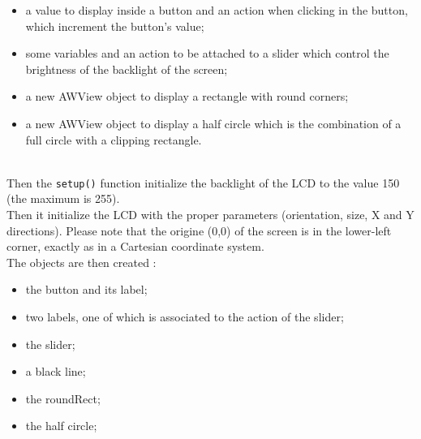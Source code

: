 \documentclass[a4paper,11pt]{extarticle}
\begin{document}
\begin{itemize}
\item  a value to display inside a button and an action when clicking in the button, which increment the button's value; 
 \item some variables and an action to be attached to a slider which control the brightness of the backlight of the screen;
 \item a new AWView object to display a rectangle with round corners;
 \item a new AWView object to display a half circle which is the combination of a full circle with a clipping rectangle.
\end{itemize}

~\\Then the \texttt{setup()} function initialize the backlight of the LCD to the value 150 (the maximum is 255). 
~\\Then it initialize the LCD with the proper parameters (orientation, size, X and Y directions). Please note that the origine (0,0) of the screen is in the lower-left corner, exactly as in a Cartesian coordinate system.
~\\The objects are then created :

\begin{itemize}
\item  the button and its label; 
 \item two labels, one of which is associated to the action of the slider;
 \item the slider;
 \item a black line;
 \item the roundRect;
 \item the half circle;
\end{itemize}
\end{document}

